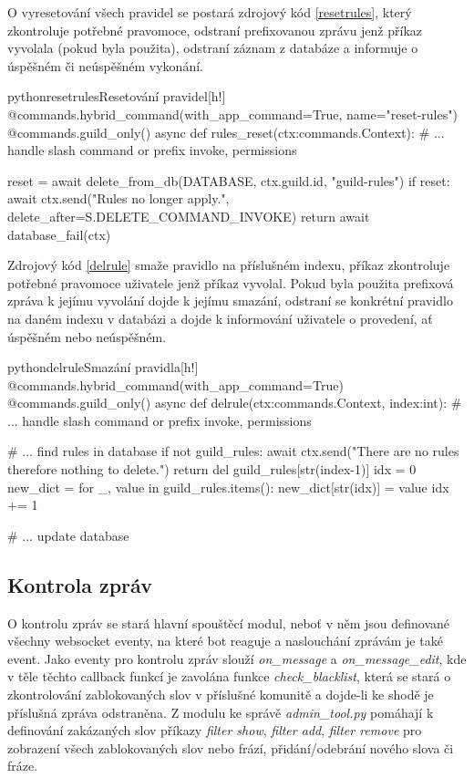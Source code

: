 \documentclass[
  program=inf,
biblatex=false,
sourcecodes=true,
joinlists=true,
  figures=true,
  tables=true,
  glossaries=true,
  index=false
]{kidiplom}
\begin{document}
O vyresetování všech pravidel se postará zdrojový kód \ref{resetrules}, který zkontroluje potřebné pravomoce,
odstraní prefixovanou zprávu jenž příkaz vyvolala (pokud byla použita), odstraní záznam z databáze a informuje o úspěšném či neúspěšném vykonání.

\begin{kicode}{python}{resetrules}{Resetování pravidel}[h!]
  @commands.hybrid_command(with_app_command=True, 
                        name="reset-rules")
  @commands.guild_only()
  async def rules_reset(ctx:commands.Context):
      # ... handle slash command or prefix invoke, permissions
      
      reset = await delete_from_db(DATABASE, 
                     ctx.guild.id, "guild-rules")
      if reset:
          await ctx.send("Rules no longer apply.", 
                          delete_after=S.DELETE_COMMAND_INVOKE)
          return
      await database_fail(ctx)
\end{kicode}

\newpage
Zdrojový kód \ref{delrule} smaže pravidlo na příslušném indexu, příkaz zkontroluje potřebné pravomoce uživatele
jenž příkaz vyvolal. Pokud byla použita prefixová zpráva k jejímu vyvolání dojde k jejímu smazání, odstraní se konkrétní pravidlo
na daném indexu v databázi a dojde k informování uživatele o provedení, ať úspěšném nebo neúspěšném.

\begin{kicode}{python}{delrule}{Smazání pravidla}[h!]
  @commands.hybrid_command(with_app_command=True)
  @commands.guild_only()
  async def delrule(ctx:commands.Context, index:int):
      # ... handle slash command or prefix invoke, permissions

      # ... find rules in database
      if not guild_rules:
          await ctx.send("There are no rules therefore nothing to delete.")
          return
      del guild_rules[str(index-1)]
      idx = 0
      new_dict = {}
      for _, value in guild_rules.items():
          new_dict[str(idx)] = value
          idx += 1
  
      # ... update database
\end{kicode}


\subsection{Kontrola zpráv}
O kontrolu zpráv se stará hlavní spouštěcí modul, neboť v něm jsou definované všechny websocket eventy, na které bot reaguje 
a naslouchání zprávám je také event.
Jako eventy pro kontrolu zpráv slouží {\it on\_message} a {\it on\_message\_edit}, kde v těle těchto callback
funkcí je zavolána funkce {\it check\_blacklist}, která se stará o zkontrolování zablokovaných slov v příslušné komunitě a dojde-li ke
shodě je příslušná zpráva odstraněna. Z modulu ke správě {\it admin\_tool.py} pomáhají k definování zakázaných slov
příkazy {\it filter show}, {\it filter add}, {\it filter remove} pro zobrazení všech zablokovaných slov nebo frází, přidání/odebrání nového slova či fráze.
\end{document}
